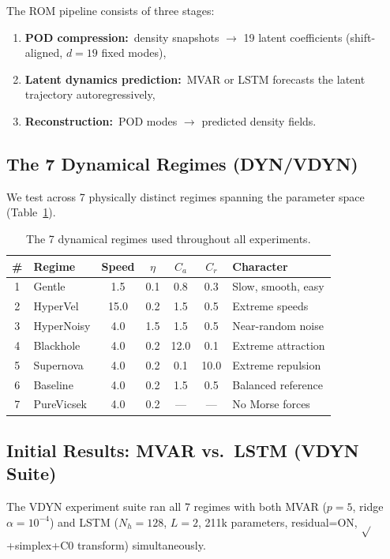 \documentclass[11pt,letterpaper]{article}
\newcommand{\regime}[1]{\textsf{#1}}
\begin{document}
The ROM pipeline consists of three stages:
\begin{enumerate}[nosep]
  \item \textbf{POD compression:}\ density snapshots $\to$ 19 latent coefficients
        (shift-aligned, $d=19$ fixed modes),
  \item \textbf{Latent dynamics prediction:}\ MVAR or LSTM forecasts the latent
        trajectory autoregressively,
  \item \textbf{Reconstruction:}\ POD modes $\to$ predicted density fields.
\end{enumerate}

\subsection{The 7 Dynamical Regimes (DYN/VDYN)}
We test across 7 physically distinct regimes spanning the parameter space
(Table~\ref{tab:regimes}).

\begin{table}[H]
\centering
\caption{The 7 dynamical regimes used throughout all experiments.}
\label{tab:regimes}
\small
\begin{tabular}{@{}clccccl@{}}
\toprule
\# & Regime & Speed & $\eta$ & $C_a$ & $C_r$ & Character \\
\midrule
1 & \regime{Gentle}       & 1.5  & 0.1 & 0.8  & 0.3  & Slow, smooth, easy \\
2 & \regime{HyperVel}     & 15.0 & 0.2 & 1.5  & 0.5  & Extreme speeds \\
3 & \regime{HyperNoisy}   & 4.0  & 1.5 & 1.5  & 0.5  & Near-random noise \\
4 & \regime{Blackhole}    & 4.0  & 0.2 & 12.0 & 0.1  & Extreme attraction \\
5 & \regime{Supernova}    & 4.0  & 0.2 & 0.1  & 10.0 & Extreme repulsion \\
6 & \regime{Baseline}     & 4.0  & 0.2 & 1.5  & 0.5  & Balanced reference \\
7 & \regime{PureVicsek}   & 4.0  & 0.2 & ---  & ---  & No Morse forces \\
\bottomrule
\end{tabular}
\end{table}

\subsection{Initial Results: MVAR vs.\ LSTM (VDYN Suite)}
The VDYN experiment suite ran all 7 regimes with both MVAR ($p\!=\!5$, ridge $\alpha\!=\!10^{-4}$)
and LSTM ($N_h\!=\!128$, $L\!=\!2$, 211k parameters, residual=ON,
$\sqrt{}$+simplex+C0 transform) simultaneously.
\end{document}

